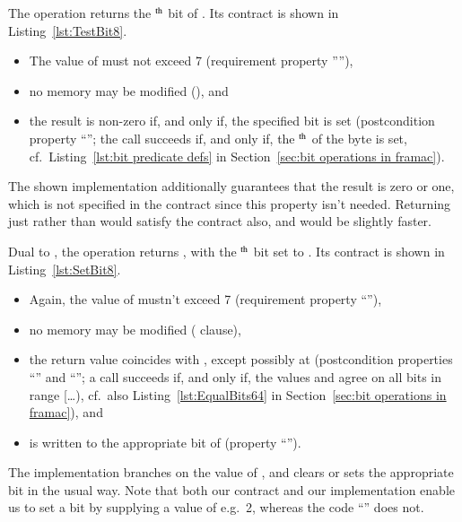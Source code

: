 The operation  returns the
$^{\mbox{\scriptsize th}}$
bit of .
%
Its contract is shown in Listing~\ref{lst:TestBit8}.
%
\begin{itemize}
\item The value of  must not exceed 7 
	(requirement property ''''),
\item no memory may be modified (), and 
\item the result is non-zero if, and only
	if, the specified bit is set (postcondition property
	``''; the call  succeeds 
	if, and only if, the $^{\mbox{\scriptsize th}}$ of
	the byte  is set, 
	cf.\ Listing~\ref{lst:bit predicate defs} in
	Section~\ref{sec:bit operations in framac}).
\end{itemize}
%
The shown implementation additionally guarantees that the result is
zero or one, which
is not specified in the contract since this property isn't needed.
%
Returning just  rather than 
would satisfy the
contract also, and would be slightly faster.






Dual to , the operation
returns , 
with the $^{\mbox{\scriptsize th}}$ bit
set to .
%
Its contract is shown in Listing~\ref{lst:SetBit8}.
%
\begin{itemize}
\item Again, the value of  mustn't exceed 7 
	(requirement property ``''),
\item no memory may be modified ( clause),
\item the return value coincides with , except possibly
	at  (postcondition properties ``'' 
	and ``''; a call
	 succeeds if, and
	only if, the  values  and
	 agree on all bits in range
	[\ldots{}), cf.\ also
	Listing~\ref{lst:EqualBits64} in 
	Section~\ref{sec:bit operations in framac}), and 
\item {} is written to the appropriate bit of 
	 (property ``'').
\end{itemize}
%
The implementation branches on the value of , and
clears or sets the
appropriate bit in the usual way.
%
Note that both our contract and our implementation enable us to set
a bit by supplying a
 value of e.g.\ 2, whereas the code 
``'' does not.





